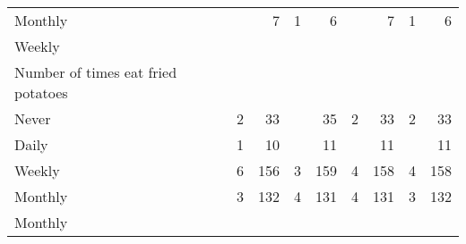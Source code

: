 \documentclass{article}
\begin{document}
\begin{tabular}{lllllllll}
\multicolumn{1}{l}{\hspace{5em}Monthly} &
  \multicolumn{1}{|r}{} &
  \multicolumn{1}{r}{7} &
  \multicolumn{1}{r}{1} &
  \multicolumn{1}{r}{6} &
  \multicolumn{1}{r}{} &
  \multicolumn{1}{r}{7} &
  \multicolumn{1}{r}{1} &
  \multicolumn{1}{r}{6} \\
\multicolumn{1}{l}{\hspace{3em}Weekly} &
  \multicolumn{1}{|r}{} &
  \multicolumn{1}{r}{} &
  \multicolumn{1}{r}{} &
  \multicolumn{1}{r}{} &
  \multicolumn{1}{r}{} &
  \multicolumn{1}{r}{} &
  \multicolumn{1}{r}{} &
  \multicolumn{1}{r}{} \\
\multicolumn{1}{l}{\hspace{4em}Number of times eat fried potatoes} &
  \multicolumn{1}{|r}{} &
  \multicolumn{1}{r}{} &
  \multicolumn{1}{r}{} &
  \multicolumn{1}{r}{} &
  \multicolumn{1}{r}{} &
  \multicolumn{1}{r}{} &
  \multicolumn{1}{r}{} &
  \multicolumn{1}{r}{} \\
\multicolumn{1}{l}{\hspace{5em}Never} &
  \multicolumn{1}{|r}{2} &
  \multicolumn{1}{r}{33} &
  \multicolumn{1}{r}{} &
  \multicolumn{1}{r}{35} &
  \multicolumn{1}{r}{2} &
  \multicolumn{1}{r}{33} &
  \multicolumn{1}{r}{2} &
  \multicolumn{1}{r}{33} \\
\multicolumn{1}{l}{\hspace{5em}Daily} &
  \multicolumn{1}{|r}{1} &
  \multicolumn{1}{r}{10} &
  \multicolumn{1}{r}{} &
  \multicolumn{1}{r}{11} &
  \multicolumn{1}{r}{} &
  \multicolumn{1}{r}{11} &
  \multicolumn{1}{r}{} &
  \multicolumn{1}{r}{11} \\
\multicolumn{1}{l}{\hspace{5em}Weekly} &
  \multicolumn{1}{|r}{6} &
  \multicolumn{1}{r}{156} &
  \multicolumn{1}{r}{3} &
  \multicolumn{1}{r}{159} &
  \multicolumn{1}{r}{4} &
  \multicolumn{1}{r}{158} &
  \multicolumn{1}{r}{4} &
  \multicolumn{1}{r}{158} \\
\multicolumn{1}{l}{\hspace{5em}Monthly} &
  \multicolumn{1}{|r}{3} &
  \multicolumn{1}{r}{132} &
  \multicolumn{1}{r}{4} &
  \multicolumn{1}{r}{131} &
  \multicolumn{1}{r}{4} &
  \multicolumn{1}{r}{131} &
  \multicolumn{1}{r}{3} &
  \multicolumn{1}{r}{132} \\
\multicolumn{1}{l}{\hspace{3em}Monthly} &
  \multicolumn{1}{|r}{} &
  \multicolumn{1}{r}{} &
  \multicolumn{1}{r}{} &
  \multicolumn{1}{r}{} &
  \multicolumn{1}{r}{} &
  \multicolumn{1}{r}{} &
  \multicolumn{1}{r}{} &

\end{tabular}
\end{document}
